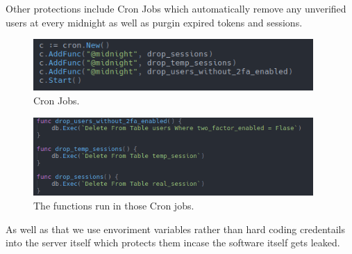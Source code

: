 \documentclass[a4paper]{article}
\begin{document}
Other protections include Cron Jobs which automatically remove any unverified users at every midnight as well as purgin expired tokens and sessions.

\begin{figure}[H]
    \begin{center}
        \includegraphics[width=0.95\textwidth]{cron.png}
    \end{center}
    \caption{Cron Jobs.}\label{fig:}
\end{figure}

\begin{figure}[H]
    \begin{center}
        \includegraphics[width=0.95\textwidth]{cronfunc.png}
    \end{center}
    \caption{The functions run in those Cron jobs.}\label{fig:}
\end{figure}

As well as that we use envoriment variables rather than hard coding credentails into the server itself which protects them incase the software itself gets leaked.
\end{document}
